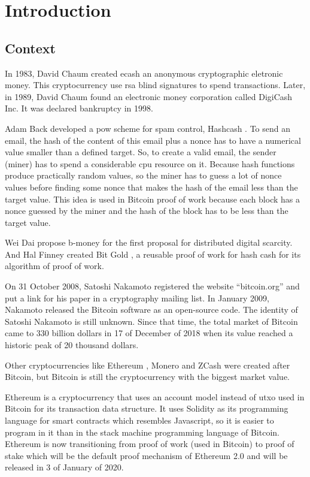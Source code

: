 \section{Introduction}

\subsection{Context} 

In 1983, David Chaum created ecash \cite{panurach1996money} an anonymous cryptographic eletronic money.
This cryptocurrency use \gls{rsa} blind signatures \cite{chaum1983blind} to spend transactions.
Later, in 1989, David Chaum found an electronic money corporation called DigiCash Inc.
It was declared bankruptcy in 1998.

Adam Back developed a \gls{pow} scheme for spam control, Hashcash \cite{back2002hashcash}.
To send an email, the hash of the content of this email plus a nonce has to have a numerical value
smaller than a defined target.
So, to create a valid email, the sender (miner) has to spend a considerable \gls{cpu} resource on it.
Because hash functions produce practically random values, so the miner has to guess a lot of nonce
values before finding some nonce that makes the hash of the email less than the target value.
This idea is used in Bitcoin proof of work because each block has a nonce guessed by the miner and
the hash of the block has to be less than the target value.

Wei Dai propose b-money \cite{dai1998b} for the first proposal for distributed digital scarcity.
And Hal Finney created Bit Gold \cite{wallace2011rise}, a reusable proof of work for hash cash for
its algorithm of proof of work.

On 31 October 2008, Satoshi Nakamoto registered the website ``bitcoin.org'' and put a link for his
paper \cite{nakamoto2008bitcoin} in a cryptography mailing list.
In January 2009, Nakamoto released the Bitcoin software as an open-source code.
The identity of Satoshi Nakamoto is still unknown.
Since that time, the total market of Bitcoin came to 330 billion dollars in 17 of December of 2018
when its value reached a historic peak of 20 thousand dollars.

Other cryptocurrencies like Ethereum \cite{wood2014ethereum}, Monero \cite{noether2015ring} and
ZCash \cite{hopwood2016zcash} were created after Bitcoin,
but Bitcoin is still the cryptocurrency with the biggest market value.

Ethereum is a cryptocurrency that uses an account model instead of \gls{utxo} used in Bitcoin for its
transaction data structure.
It uses Solidity as its programming language for smart contracts which resembles Javascript,
so it is easier to program in it than in the stack machine programming language of Bitcoin.
Ethereum is now transitioning from proof of work (used in Bitcoin) to proof of stake
which will be the default proof mechanism of Ethereum 2.0 and will be released in
3 of January of 2020.

